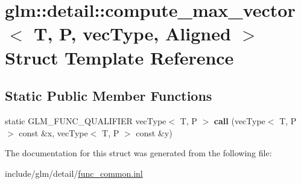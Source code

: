\hypertarget{structglm_1_1detail_1_1compute__max__vector}{}\section{glm\+:\+:detail\+:\+:compute\+\_\+max\+\_\+vector$<$ T, P, vec\+Type, Aligned $>$ Struct Template Reference}
\label{structglm_1_1detail_1_1compute__max__vector}
\subsection*{Static Public Member Functions}
\begin{DoxyCompactItemize}
\item 
\mbox{\label{structglm_1_1detail_1_1compute__max__vector_ac3b94f18fd36a063d5915998d252b97f}} 
static G\+L\+M\+\_\+\+F\+U\+N\+C\+\_\+\+Q\+U\+A\+L\+I\+F\+I\+ER vec\+Type$<$ T, P $>$ {\bfseries call} (vec\+Type$<$ T, P $>$ const \&x, vec\+Type$<$ T, P $>$ const \&y)
\end{DoxyCompactItemize}


The documentation for this struct was generated from the following file\+:\begin{DoxyCompactItemize}
\item 
include/glm/detail/\hyperlink{func__common_8inl}{func\+\_\+common.\+inl}\end{DoxyCompactItemize}
